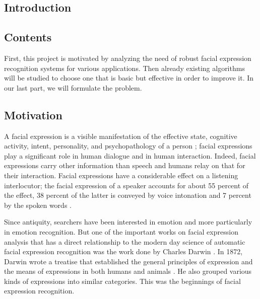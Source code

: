 \newpage
  \begin{titlepage}
    \vspace*{\fill}
      \part{Introduction}
    \vspace*{\fill}
  \end{titlepage}

\chapter*{Contents}
First, this project is motivated by analyzing the need of robust facial expression recognition systems for various applications. Then already existing algorithms will be studied to choose one that is basic but effective in order to improve it. In our last part, we will formulate the problem.


\chapter{Motivation}

A facial expression is a visible manifestation of the effective state, cognitive activity, intent, personality, and psychopathology of a person \cite{DON99}; facial expressions play a significant role in human dialogue and in human interaction. Indeed, facial expressions carry other information than speech and humans relay on that for their interaction. Facial expressions have a considerable effect on a listening interlocutor; the facial expression of a speaker accounts for about 55 percent of the effect, 38 percent of the latter is conveyed by voice intonation and 7 percent by the spoken words \cite{PAN00}.

Since antiquity, searchers have been interested in emotion and more particularly in emotion recognition. But one of the important works on facial expression analysis that has a direct relationship to the modern day science of automatic facial expression recognition was the work done by Charles Darwin \cite{BET12}. In 1872, Darwin wrote a treatise that established the general principles of expression and the means of expressions in both humans and animals \cite{DAR04}. He also grouped various kinds of expressions into similar categories. This was the beginnings of facial expression recognition.

